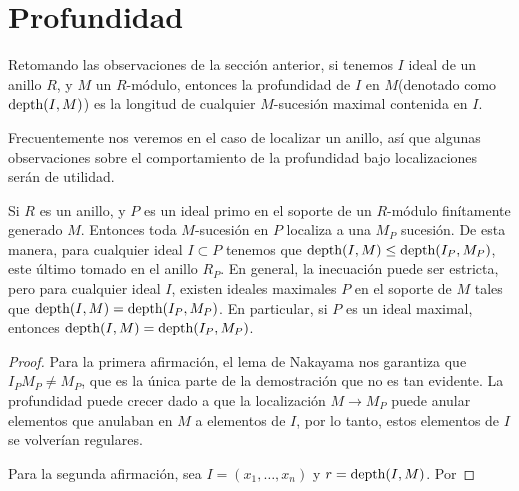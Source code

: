 \section{Profundidad}

Retomando las observaciones de la sección anterior, si tenemos $I$ ideal de un anillo $R$, y $M$ un $R$-módulo, entonces la profundidad de $I$ en $M$(denotado como $\textrm{depth}(I, M)$) es la longitud de cualquier $M$-sucesión maximal contenida en $I$.

Frecuentemente nos veremos en el caso de localizar un anillo, así que algunas observaciones sobre el comportamiento de la profundidad bajo localizaciones serán de utilidad.

\begin{lemma}
Si $R$ es un anillo, y $P$ es un ideal primo en el soporte de un $R$-módulo finítamente generado $M$. Entonces toda $M$-sucesión en $P$ localiza a una $M_P$ sucesión. De esta manera, para cualquier ideal $I \subset P$ tenemos que $\textrm{depth}(I,M) \leq \textrm{depth}(I_P, M_P)$, este último tomado en el anillo $R_P$. En general, la inecuación puede ser estricta, pero para cualquier ideal $I$, existen ideales maximales $P$ en el soporte de $M$ tales que $\textrm{depth}(I,M) = \textrm{depth}(I_P, M_P)$. En particular, si $P$ es un ideal maximal, entonces $\textrm{depth}(I,M) = \textrm{depth}(I_P, M_P)$.
\end{lemma}

\begin{proof}
Para la primera afirmación, el lema de Nakayama nos garantiza que $I_PM_P \neq M_P$, que es la única parte de la demostración que no es tan evidente. La profundidad puede crecer dado a que la localización $M \rightarrow M_P$ puede anular elementos que anulaban en $M$ a elementos de $I$, por lo tanto, estos elementos de $I$ se volverían regulares.

Para la segunda afirmación, sea $I = (x_1,\dots,x_n)$ y $r = \textrm{depth}(I, M)$. Por 
\end{proof}